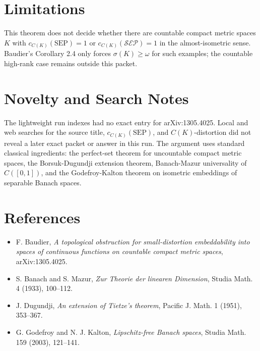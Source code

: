 \documentclass[11pt]{article}
\begin{document}
\section*{Limitations}

This theorem does not decide whether there are countable compact metric spaces \(K\) with \(c_{C(K)}(\mathrm{SEP})=1\) or \(c_{C(K)}(\mathcal{SEP})=1\) in the almost-isometric sense.  Baudier's Corollary 2.4 only forces \(\sigma(K)\ge\omega\) for such examples; the countable high-rank case remains outside this packet.

\section*{Novelty and Search Notes}

The lightweight run indexes had no exact entry for arXiv:1305.4025.  Local and web searches for the source title, \(c_{C(K)}(\mathrm{SEP})\), and \(C(K)\)-distortion did not reveal a later exact packet or answer in this run.  The argument uses standard classical ingredients: the perfect-set theorem for uncountable compact metric spaces, the Borsuk-Dugundji extension theorem, Banach-Mazur universality of \(C([0,1])\), and the Godefroy-Kalton theorem on isometric embeddings of separable Banach spaces.

\section*{References}

\begin{itemize}
\item F. Baudier, \emph{A topological obstruction for small-distortion embeddability into spaces of continuous functions on countable compact metric spaces}, arXiv:1305.4025.
\item S. Banach and S. Mazur, \emph{Zur Theorie der linearen Dimension}, Studia Math. 4 (1933), 100--112.
\item J. Dugundji, \emph{An extension of Tietze's theorem}, Pacific J. Math. 1 (1951), 353--367.
\item G. Godefroy and N. J. Kalton, \emph{Lipschitz-free Banach spaces}, Studia Math. 159 (2003), 121--141.
\end{itemize}
\end{document}
